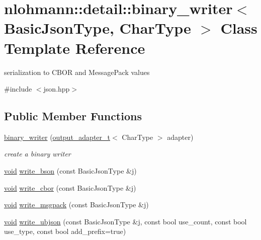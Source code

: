 \hypertarget{classnlohmann_1_1detail_1_1binary__writer}{}\section{nlohmann\+::detail\+::binary\+\_\+writer$<$ Basic\+Json\+Type, Char\+Type $>$ Class Template Reference}
\label{classnlohmann_1_1detail_1_1binary__writer}


serialization to C\+B\+OR and Message\+Pack values  




{\ttfamily \#include $<$json.\+hpp$>$}

\subsection*{Public Member Functions}
\begin{DoxyCompactItemize}
\item 
\mbox{\hyperlink{classnlohmann_1_1detail_1_1binary__writer_a373289af95a946c19bb4a58a5df71a78}{binary\+\_\+writer}} (\mbox{\hyperlink{namespacenlohmann_1_1detail_a9b680ddfb58f27eb53a67229447fc556}{output\+\_\+adapter\+\_\+t}}$<$ Char\+Type $>$ adapter)
\begin{DoxyCompactList}\small\item\em create a binary writer \end{DoxyCompactList}\item 
\mbox{\hyperlink{namespacenlohmann_1_1detail_a59fca69799f6b9e366710cb9043aa77d}{void}} \mbox{\hyperlink{classnlohmann_1_1detail_1_1binary__writer_a9ffc566db5219b473762462234b47db9}{write\+\_\+bson}} (const Basic\+Json\+Type \&j)
\item 
\mbox{\hyperlink{namespacenlohmann_1_1detail_a59fca69799f6b9e366710cb9043aa77d}{void}} \mbox{\hyperlink{classnlohmann_1_1detail_1_1binary__writer_aa0ab8d27fd88a33a2f801413ac4c7fbc}{write\+\_\+cbor}} (const Basic\+Json\+Type \&j)
\item 
\mbox{\hyperlink{namespacenlohmann_1_1detail_a59fca69799f6b9e366710cb9043aa77d}{void}} \mbox{\hyperlink{classnlohmann_1_1detail_1_1binary__writer_ae4e0852b64102ce4b07d99f08f828b7c}{write\+\_\+msgpack}} (const Basic\+Json\+Type \&j)
\item 
\mbox{\hyperlink{namespacenlohmann_1_1detail_a59fca69799f6b9e366710cb9043aa77d}{void}} \mbox{\hyperlink{classnlohmann_1_1detail_1_1binary__writer_a0f6c65053d859269f88eb4ebb0cd7060}{write\+\_\+ubjson}} (const Basic\+Json\+Type \&j, const bool use\+\_\+count, const bool use\+\_\+type, const bool add\+\_\+prefix=true)
\end{DoxyCompactItemize}
